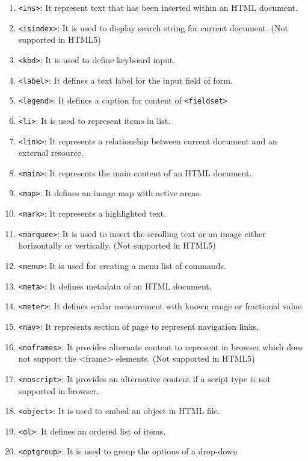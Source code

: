 \documentclass[a4paper]{article}
\begin{document}
\begin{enumerate}
    \item \texttt{<ins>}: It represent text that has been inserted within 
      an HTML document.
    \item \texttt{<isindex>}: It is used to display search string for 
      current document. (Not supported in HTML5)
    \item \texttt{<kbd>}: It is used to define keyboard input.
    \item \texttt{<label>}: It defines a text label for the input field of
      form.
    \item \texttt{<legend>}: It defines a caption for content of 
      \texttt{<fieldset>}
    \item \texttt{<li>}: It is used to represent items in list.
    \item \texttt{<link>}: It represents a relationship between current 
      document and an external resource.
    \item \texttt{<main>}: It represents the main content of an HTML document.
    \item \texttt{<map>}: It defines an image map with active areas.
    \item \texttt{<mark>}: It represents a highlighted text.
    \item \texttt{<marquee>}: It is used to insert the scrolling text or an 
      image either horizontally or vertically. (Not supported in HTML5)
    \item \texttt{<menu>}: It is used for creating a menu list of commands.
    \item \texttt{<meta>}: It defines metadata of an HTML document.
    \item \texttt{<meter>}: It defines scalar measurement with known range 
      or fractional value.
    \item \texttt{<nav>}: It represents section of page to represent
      navigation links.
    \item \texttt{<noframes>}: It provides alternate content to represent in 
      browser which does not support the <frame> elements. (Not supported in
      HTML5)
    \item \texttt{<noscript>}: It provides an alternative content if a script 
      type is not supported in browser.
    \item \texttt{<object>}: It is used to embed an object in HTML file.
    \item \texttt{<ol>}: It defines an ordered list of items.
    \item \texttt{<optgroup>}: It is used to group the options of a drop-down 

\end{enumerate}
\end{document}
